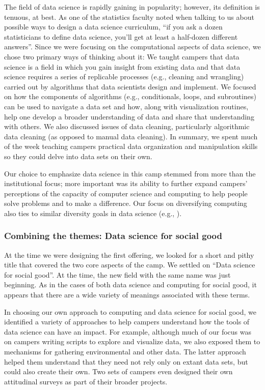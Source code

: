 The field of data science is rapidly gaining in popularity; however,
its definition is tenuous, at best.  As one of the statistics faculty
noted when talking to us about possible ways to design a data science
curriculum, ``if you ask a dozen statisticians to define data
science, you'll get at least a half-dozen different answers''.
Since we were focusing on the computational aspects of data science,
we chose two primary ways of thinking about it: We taught campers
that data science is a field in which you gain insight from existing
data and that data science requires a series of replicable processes
(e.g., cleaning and wrangling) carried out by algorithms that data
scientists design and implement.  We focused on how the components
of algorithms (e.g., conditionals,  loops, and subroutines) can be
used to navigate a data set and how, along with visualization
routines, help one develop a broader understanding of data and share
that understanding with others.  We also discussed issues of data
cleaning, particularly algorithmic data cleaning (as opposed to
manual data cleaning).  In summary, we spent much of the week
teaching campers practical data organization and manipulation skills
so they could delve into data sets on their own.

Our choice to emphasize data science in this camp stemmed from more
than the institutional focus; more important was its ability to
further expand campers' perceptions of the capacity of computer
science and computing to help people solve problems and to make a
difference.  Our focus on diversifying computing also ties to similar
diversity goals in data science (e.g., \cite{Berman2015}).

\subsubsection{Combining the themes: Data science for social good}

At the time we were designing the first offering, we looked
for a short and pithy title that covered the two core aspects of the camp.
We settled on ``Data science for social good''.  At the time, the
new field with the same name was just beginning.  As in the cases of
both data science and computing for social good, it appears that there
are a wide variety of meanings associated with these terms.

In choosing our own approach to computing and data science for
social good, we identified a variety of approaches to help campers
understand how the tools of data science can have an impact.  For
example, although much of our focus was on campers writing scripts
to explore and visualize data, we also exposed them to mechanisms
for gathering environmental and other data.  The latter approach
helped them understand that they need not rely only on extant data
sets, but could also create their own.  Two sets of campers even
designed their own attitudinal surveys as part of their broader
projects.

